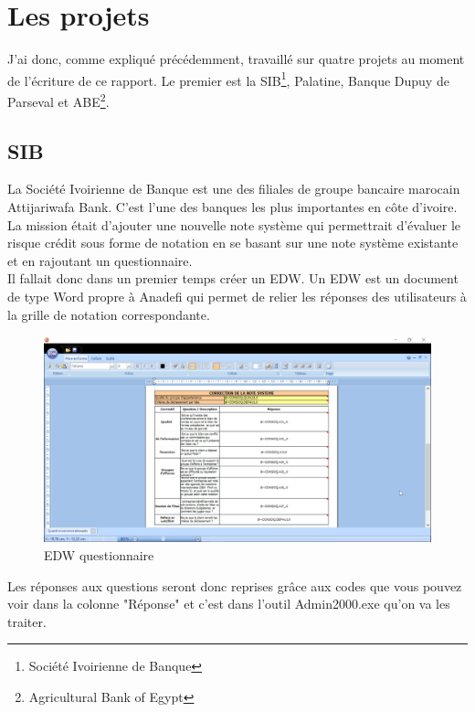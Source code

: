 \section{Les projets}

J'ai donc, comme expliqué précédemment, travaillé sur quatre projets au moment de l'écriture de ce rapport.
Le premier est la SIB\footnote{Société Ivoirienne de Banque}, Palatine, Banque Dupuy de Parseval et ABE\footnote{Agricultural Bank of Egypt}.

\subsection{SIB}

La Société Ivoirienne de Banque est une des filiales de groupe bancaire marocain Attijariwafa Bank. C'est l'une des banques les plus importantes en côte d'ivoire.\\

La mission était d'ajouter une nouvelle note système qui permettrait d'évaluer le risque crédit sous forme de notation en se basant sur une note système existante et en rajoutant un questionnaire.\\

Il fallait donc dans un premier temps créer un EDW. Un EDW est un document de type Word propre à Anadefi qui permet de relier les réponses des utilisateurs à la grille de notation correspondante.

\begin{figure}[h]
\centering
\includegraphics[scale=0.5]{resources/edw.png}
\caption{EDW questionnaire}
\label{edwSIB}
\end{figure}

Les réponses aux questions seront donc reprises grâce aux codes que vous pouvez voir dans la colonne "Réponse" et c'est dans l'outil Admin2000.exe qu'on va les traiter.\\

